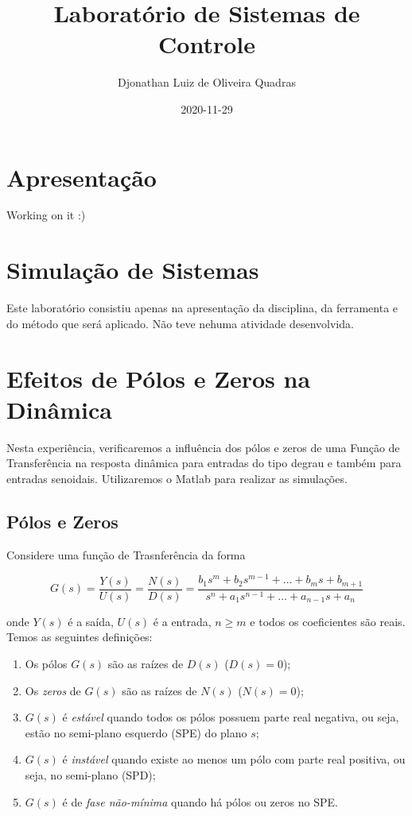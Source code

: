 \documentclass[
]{book}
\title{Laboratório de Sistemas de Controle}
\author{Djonathan Luiz de Oliveira Quadras}
\date{2020-11-29}
\providecommand{\tightlist}{%
  \setlength{\itemsep}{0pt}\setlength{\parskip}{0pt}}
\theoremstyle{definition}
\theoremstyle{definition}
\theoremstyle{definition}
\theoremstyle{remark}
\begin{document}
\maketitle

{
\setcounter{tocdepth}{1}
\tableofcontents
}
\hypertarget{apresentauxe7uxe3o}{%
\chapter*{Apresentação}\label{apresentauxe7uxe3o}}

Working on it :)

\hypertarget{simulauxe7uxe3o-de-sistemas}{%
\chapter{Simulação de Sistemas}\label{simulauxe7uxe3o-de-sistemas}}

Este laboratório consistiu apenas na apresentação da disciplina, da ferramenta e do método que será aplicado. Não teve nehuma atividade desenvolvida.

\hypertarget{lab2}{%
\chapter{Efeitos de Pólos e Zeros na Dinâmica}\label{lab2}}

Nesta experiência, verificaremos a influência dos pólos e zeros de uma Função de Transferência na resposta dinâmica para entradas do tipo degrau e também para entradas senoidais. Utilizaremos o Matlab para realizar as
simulações.

\hypertarget{puxf3los-e-zeros}{%
\section{Pólos e Zeros}\label{puxf3los-e-zeros}}

Considere uma função de Trasnferência da forma

\[
G(s) = \frac{Y(s)}{U(s)} = \frac{N(s)}{D(s)} = \frac{b_1s^m +b_2s^{m-1} + \dots + b_ms + b_{m+1}}{s^n + a_1s^{n-1}+ \dots + a_{n-1}s + a_n}
\]

onde \(Y(s)\) é a saída, \(U(s)\) é a entrada, \(n \geq m\) e todos os coeficientes são reais. Temos as seguintes definições:

\begin{enumerate}
\def\labelenumi{\arabic{enumi}.}
\tightlist
\item
  Os pólos \(G(s)\) são as raízes de \(D(s)\) (\(D(s) = 0\));
\item
  Os \emph{zeros} de \(G(s)\) são as raízes de \(N(s)\) (\(N(s) = 0\));
\item
  \(G(s)\) é \emph{estável} quando todos os pólos possuem parte real negativa, ou seja, estão no semi-plano esquerdo (SPE) do plano \(s\);
\item
  \(G(s)\) é \emph{instável} quando existe ao menos um pólo com parte real positiva, ou seja, no semi-plano (SPD);
\item
  \(G(s)\) é de \emph{fase não-mínima} quando há pólos ou zeros no SPE.
\end{enumerate}
\end{document}
